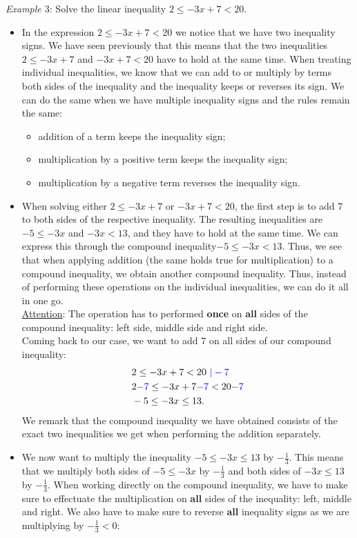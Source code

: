 \documentclass[12pt]{article}
\begin{document}
\textit{Example $3$}: Solve the linear inequality $2\leq -3x+7<20$.
\begin{itemize}
\item In the expression $2\leq -3x+7<20$ we notice that we have two inequality signs. We have seen previously that this means that the two inequalities $2\leq -3x+7$ and $-3x+7<20$ have to hold at the same time. When treating individual inequalities, we know that we can add to or multiply by terms both sides of the inequality and the inequality keeps or reverses its sign. We can do the same when we have multiple inequality signs and the rules remain the same:
\begin{itemize}
\item addition of a term keeps the inequality sign;
\item multiplication by a positive term keeps the inequality sign;
\item multiplication by a negative term reverses the inequality sign.
\end{itemize}
\item When solving either $2\leq -3x+7$ or $-3x+7<20$, the first step is to add $7$ to both sides of the respective inequality. The resulting inequalities are $-5\leq -3x$ and $-3x<13$, and they have to hold at the same time. We can express this through the compound inequality$-5\leq -3x<13$. Thus, we see that when applying addition (the same holds true for multiplication) to a compound inequality, we obtain another compound inequality. Thus, instead of performing these operations on the individual inequalities, we can do it all in one go.\\
\underline{Attention}: The operation has to performed \textbf{once} on \textbf{all} sides of the compound inequality: left side, middle side and right side. \\
Coming back to our case, we want to add $7$ on all sides of our compound inequality:
\begin{equation*}
\begin{split}
& 2\leq -3x+7<20 \textcolor{blue}{\ | -7}\\
& 2\textcolor{blue}{-7}\leq -3x+7\textcolor{blue}{-7}<20\textcolor{blue}{-7}\\
& -5\leq -3x\leq 13.
\end{split}
\end{equation*}
We remark that the compound inequality we have obtained consists of the exact two inequalities we get when performing the addition separately.
\item We now want to multiply the inequality $ -5\leq -3x\leq 13$ by $-\frac{1}{3}$. This means that we multiply both sides of $ -5\leq -3x$ by $-\frac{1}{3}$ and both sides of $-3x\leq 13$ by $-\frac{1}{3}$. When working directly on the compound inequality, we have to make sure to effectuate the multiplication on \textbf{all} sides of the inequality: left, middle and right. We also have to make sure to reverse \textbf{all} inequality signs as we are multiplying by $-\frac{1}{3}<0$:

\end{itemize}
\end{document}
